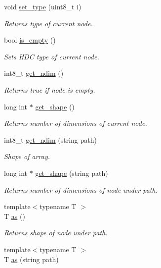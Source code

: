 \begin{DoxyCompactItemize}
void \hyperlink{a00003_a6d1d1064db92be176775481eb6ca9fd3}{set\+\_\+type} (uint8\+\_\+t i)
\begin{DoxyCompactList}\small\item\em Returns type of current node. \end{DoxyCompactList}\item 
bool \hyperlink{a00003_af1a86c27a06e02651f544947eb9b0cfb}{is\+\_\+empty} ()
\begin{DoxyCompactList}\small\item\em Sets H\+DC type of current node. \end{DoxyCompactList}\item 
int8\+\_\+t \hyperlink{a00003_a759758dd2b6b8986341753e94ad12252}{get\+\_\+ndim} ()
\begin{DoxyCompactList}\small\item\em Returns true if node is empty. \end{DoxyCompactList}\item 
long int $\ast$ \hyperlink{a00003_aa73e21aec9037f1f6bf9bb899f743b00}{get\+\_\+shape} ()
\begin{DoxyCompactList}\small\item\em Returns number of dimensions of current node. \end{DoxyCompactList}\item 
int8\+\_\+t \hyperlink{a00003_ac8d2e3eb577519c8caa5ea59a34ae75b}{get\+\_\+ndim} (string path)
\begin{DoxyCompactList}\small\item\em Shape of array. \end{DoxyCompactList}\item 
long int $\ast$ \hyperlink{a00003_a9684ce622a000411e1c747f4f694c92f}{get\+\_\+shape} (string path)
\begin{DoxyCompactList}\small\item\em Returns number of dimensions of node under path. \end{DoxyCompactList}\item 
{\footnotesize template$<$typename T $>$ }\\T \hyperlink{a00003_ae35cce784c60574515001b66d0271fa9}{as} ()
\begin{DoxyCompactList}\small\item\em Returns shape of node under path. \end{DoxyCompactList}\item 
{\footnotesize template$<$typename T $>$ }\\T \hyperlink{a00003_ac1dd72a041586072f7984022ba8a048e}{as} (string path)

\end{DoxyCompactItemize}
